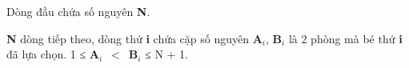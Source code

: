 Dòng đầu chứa số nguyên \textbf{N}.

\textbf{N} dòng tiếp theo, dòng thứ \textbf{i} chứa cặp số nguyên \textbf{A$_i$}, \textbf{B$_i$} là 2 phòng mà bé thứ \textbf{i} đã lựa chọn. 1 ≤ \textbf{A$_i$} $<$ \textbf{B$_i$} ≤ N + 1.